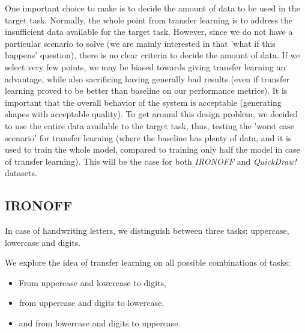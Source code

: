   \par One important choice to make is to decide the amount of data to be used in the target task. Normally, the whole point from transfer learning is to address the insufficient data available for the target task. However, since we do not have a particular scenario to solve (we are mainly interested in that 'what if this happens' question), there is no clear criteria to decide the amount of data. If we select very few points, we may be biased towards giving transfer learning an advantage, while also sacrificing having generally bad results (even if transfer learning proved to be better than baseline on our performance metrics). It is important that the overall behavior of the system is acceptable (generating shapes with acceptable quality). To get around this design problem, we decided to use the entire data available to the target task, thus, testing the 'worst case scenario' for transfer learning (where the baseline has plenty of data, and it is used to train the whole model, compared to training only half the model in case of transfer learning). This will be the case for both \textit{IRONOFF} and \textit{QuickDraw!} datasets.

  \subsection{IRONOFF}
    \par In case of handwriting letters, we distinguish between three tasks: uppercase, lowercase and digits.
    \par We explore the idea of transfer learning on all possible combinations of tasks:
    \begin{itemize}
      \item From uppercase and lowercase to digits,
      \item from uppercase and digits to lowercase,
      \item and from lowercase and digits to uppercase.
    \end{itemize}

